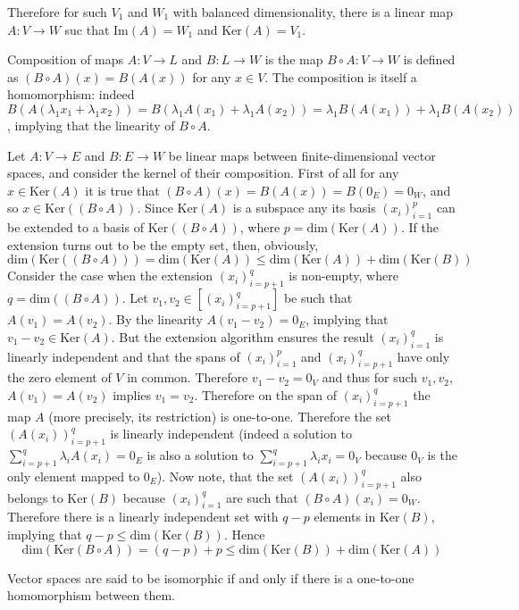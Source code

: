 \documentclass[a4paper]{article}
\newcommand{\brac}[1]{\ensuremath{\left( #1 \right)}}
\newcommand{\spn}[1]{\ensuremath{\left[ #1 \right]}}
\newcommand{\Dim}[1]{\ensuremath{\text{dim}\brac{ #1 }}}
\newcommand{\Ker}[1]{\ensuremath{\text{Ker}\brac{ #1 }}}
\newcommand{\im}[1]{\ensuremath{\text{Im}\brac{ #1 }}}
\begin{document}
Therefore for such $V_1$ and $W_1$ with balanced dimensionality, there is a linear map $A:V\to W$ suc that $\im{A} = W_1$ and $\Ker{A}=V_1$. 

Composition of maps $A:V\to L$ and $B:L\to W$ is the map $B\circ A:V \to W$ is defined as $\brac{B\circ A}\brac{x} = B\brac{A\brac{x}}$ for any $x\in V$. The composition is itself a homomorphism: indeed $B\brac{A\brac{\lambda_1 x_1+\lambda_1 x_2}} = B\brac{\lambda_1 A\brac{x_1}+\lambda_1 A\brac{x_2}} = \lambda_1 B\brac{A\brac{x_1}}+\lambda_1 B\brac{A\brac{x_2}}$, implying that the linearity of $B\circ A$.

Let $A:V\to E$ and $B:E\to W$ be linear maps between finite-dimensional vector spaces, and consider the kernel of their composition. First of all for any $x\in \Ker{A}$ it is true that $ \brac{B\circ A}\brac{x} = B\brac{A\brac{x}} = B\brac{0_E} = 0_W$, and so $x\in \Ker{\brac{B\circ A}}$. Since $\Ker{A}$ is a subspace any its basis $\brac{x_i}_{i=1}^p$ can be extended to a basis of $\Ker{\brac{B\circ A}}$, where $p = \Dim{\Ker{A}}$. If the extension turns out to be the empty set, then, obviously, \[\Dim{\Ker{\brac{B\circ A}}} = \Dim{\Ker{A}} \leq \Dim{\Ker{A}} + \Dim{\Ker{B}}\] Consider the case when the extension $\brac{x_i}_{i=p+1}^q$ is non-empty, where $q = \Dim{\brac{B\circ A}}$. Let $v_1, v_2\in \spn{\brac{x_i}_{i=p+1}^q}$ be such that $A\brac{v_1} = A\brac{v_2}$. By the linearity $A\brac{v_1-v_2} = 0_E$, implying that $v_1-v_2\in \Ker{A}$. But the extension algorithm ensures the result $\brac{x_i}_{i=1}^q$ is linearly independent and that the spans of $\brac{x_i}_{i=1}^p$ and $\brac{x_i}_{i=p+1}^q$ have only the zero element of $V$ in common. Therefore $v_1-v_2 = 0_V$ and thus for such $v_1, v_2$, $A\brac{v_1} = A\brac{v_2}$ implies $v_1=v_2$. Therefore on the span of $\brac{x_i}_{i=p+1}^q$ the map $A$ (more precisely, its restriction) is one-to-one. Therefore the set $\brac{A\brac{x_i}}_{i=p+1}^q$ is linearly independent (indeed a solution to $\sum_{i=p+1}^q \lambda_i A\brac{x_i} = 0_E$ is also a solution to $\sum_{i=p+1}^q \lambda_i x_i = 0_V$ because $0_V$ is the only element mapped to $0_E$). Now note, that the set $\brac{A\brac{x_i}}_{i=p+1}^q$ also belongs to $\Ker{B}$ because $\brac{x_i}_{i=1}^q$ are such that $\brac{B\circ A}\brac{x_i} = 0_W$. Therefore there is a linearly independent set with $q-p$ elements in $\Ker{B}$, implying that $q-p\leq \Dim{\Ker{B}}$. Hence \[\Dim{\Ker{B\circ A}} = \brac{q-p}+p\leq \Dim{\Ker{B}} + \Dim{\Ker{A}}\]

Vector spaces are said to be isomorphic if and only if there is a one-to-one homomorphism between them.
\end{document}
